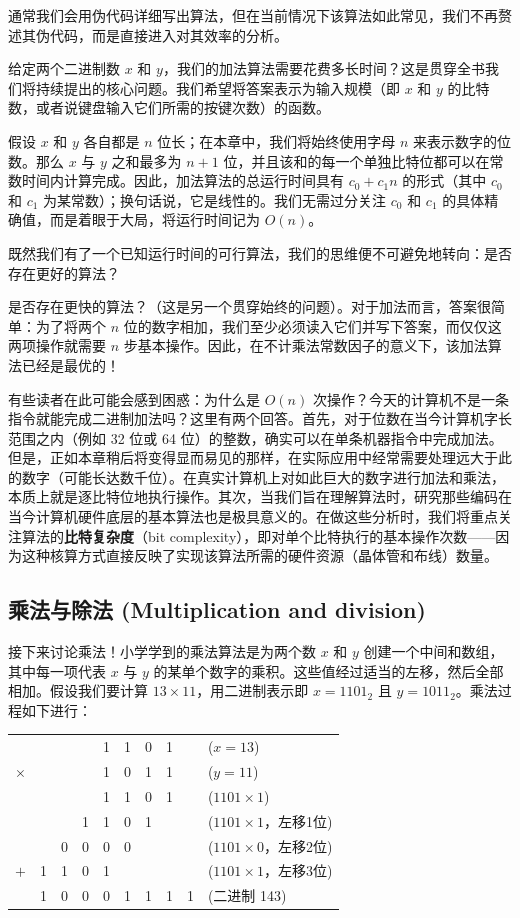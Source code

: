 通常我们会用伪代码详细写出算法，但在当前情况下该算法如此常见，我们不再赘述其伪代码，而是直接进入对其效率的分析。

给定两个二进制数 $x$ 和 $y$，我们的加法算法需要花费多长时间？这是贯穿全书我们将持续提出的核心问题。我们希望将答案表示为输入规模（即 $x$ 和 $y$ 的比特数，或者说键盘输入它们所需的按键次数）的函数。

假设 $x$ 和 $y$ 各自都是 $n$ 位长；在本章中，我们将始终使用字母 $n$ 来表示数字的位数。那么 $x$ 与 $y$ 之和最多为 $n + 1$ 位，并且该和的每一个单独比特位都可以在常数时间内计算完成。因此，加法算法的总运行时间具有 $c_0 + c_1 n$ 的形式（其中 $c_0$ 和 $c_1$ 为某常数）；换句话说，它是线性的。我们无需过分关注 $c_0$ 和 $c_1$ 的具体精确值，而是着眼于大局，将运行时间记为 $O(n)$。

既然我们有了一个已知运行时间的可行算法，我们的思维便不可避免地转向：是否存在更好的算法？

是否存在更快的算法？（这是另一个贯穿始终的问题）。对于加法而言，答案很简单：为了将两个 $n$ 位的数字相加，我们至少必须读入它们并写下答案，而仅仅这两项操作就需要 $n$ 步基本操作。因此，在不计乘法常数因子的意义下，该加法算法已经是最优的！

有些读者在此可能会感到困惑：为什么是 $O(n)$ 次操作？今天的计算机不是一条指令就能完成二进制加法吗？这里有两个回答。首先，对于位数在当今计算机字长范围之内（例如 32 位或 64 位）的整数，确实可以在单条机器指令中完成加法。但是，正如本章稍后将变得显而易见的那样，在实际应用中经常需要处理远大于此的数字（可能长达数千位）。在真实计算机上对如此巨大的数字进行加法和乘法，本质上就是逐比特位地执行操作。其次，当我们旨在理解算法时，研究那些编码在当今计算机硬件底层的基本算法也是极具意义的。在做这些分析时，我们将重点关注算法的\textbf{比特复杂度}（bit complexity），即对单个比特执行的基本操作次数——因为这种核算方式直接反映了实现该算法所需的硬件资源（晶体管和布线）数量。

\subsection{乘法与除法 (Multiplication and division)}
接下来讨论乘法！小学学到的乘法算法是为两个数 $x$ 和 $y$ 创建一个中间和数组，其中每一项代表 $x$ 与 $y$ 的某单个数字的乘积。这些值经过适当的左移，然后全部相加。假设我们要计算 $13 \times 11$，用二进制表示即 $x = 1101_2$ 且 $y = 1011_2$。乘法过程如下进行：

\begin{center}
\begin{tabular}{rccccccccl}
& & & & 1 & 1 & 0 & 1 & & ($x = 13$) \\
$\times$ & & & & 1 & 0 & 1 & 1 & & ($y = 11$) \\
\hline
& & & & 1 & 1 & 0 & 1 & & ($1101 \times 1$) \\
& & & 1 & 1 & 0 & 1 & & & ($1101 \times 1$，左移1位) \\
& & 0 & 0 & 0 & 0 & & & & ($1101 \times 0$，左移2位) \\
$+$ & 1 & 1 & 0 & 1 & & & & & ($1101 \times 1$，左移3位) \\
\hline
& 1 & 0 & 0 & 0 & 1 & 1 & 1 & 1 & (二进制 143)
\end{tabular}
\end{center}

